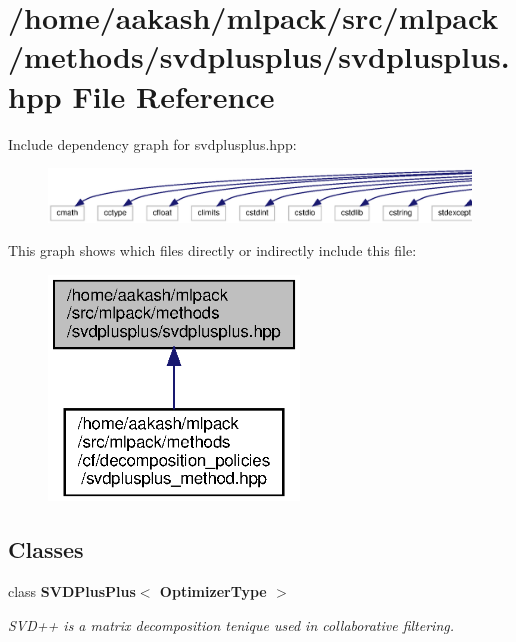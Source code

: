 \section{/home/aakash/mlpack/src/mlpack/methods/svdplusplus/svdplusplus.hpp File Reference}
\label{svdplusplus_8hpp}
Include dependency graph for svdplusplus.\+hpp\+:
\nopagebreak
\begin{figure}[H]
\begin{center}
\leavevmode
\includegraphics[width=350pt]{svdplusplus_8hpp__incl}
\end{center}
\end{figure}
This graph shows which files directly or indirectly include this file\+:
\nopagebreak
\begin{figure}[H]
\begin{center}
\leavevmode
\includegraphics[width=189pt]{svdplusplus_8hpp__dep__incl}
\end{center}
\end{figure}
\subsection*{Classes}
\begin{DoxyCompactItemize}
\item 
class \textbf{ S\+V\+D\+Plus\+Plus$<$ Optimizer\+Type $>$}
\begin{DoxyCompactList}\small\item\em S\+V\+D++ is a matrix decomposition tenique used in collaborative filtering. \end{DoxyCompactList}\end{DoxyCompactItemize}
